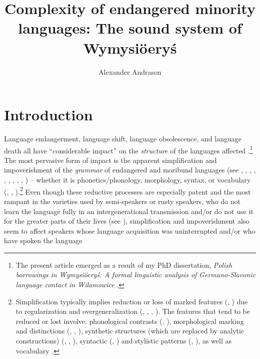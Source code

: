 \documentclass[output=paper,hidelinks]{langscibook}
\author{Alexander Andrason\affiliation{Stellenbosch University}}
\title{Complexity of endangered minority languages: The sound system of Wymysiöeryś}
\begin{document}
\maketitle


\section{Introduction} %
\label{AAsect1}
Language endangerment, language shift, language obsolescence, and language death all have “considerable impact” on the \textit{structure} of the languages affected \citep[110]{palosaari_structural_2011}.\footnote{The present article emerged as a result of my PhD dissertation, \textit{Polish borrowings in Wymysiöeryś: A formal linguistic analysis of Germano-Slavonic language contact in Wilamowice} \citep{Andrason2021}.} The most pervasive form of impact is the apparent simplification and impoverishment of the \textit{grammar} of endangered and moribund languages (see \citealt[590--591]{dorian_grammatical_1973}, \citeyear[85]{dorian_language_1980}, \citealt[9]{silva-corvalan_study_1995}, \citealt[256]{mesthrie_introducing_2009}, \citealt[110--117]{palosaari_structural_2011}, \citealt[101, 111, 118]{sallabank_diversity_2012}, \citeyear[126]{sallabank_attitudes_2013}, \citealt[2]{filipovic_introduction_2016}, \citealt[43]{aikhenvald_grammars_2007}, \citealt[294, 297]{meakins_birth_2019}) – whether it is phonetics/phonology, morphology, syntax, or vocabulary (\citealt[591]{dorian_fate_1978}, \citeyear[85]{dorian_language_1980}, \citealt[110, 113--115]{palosaari_structural_2011}).\footnote{Simplification typically implies reduction or loss of marked features (\citealt[113]{palosaari_structural_2011}, \citealt[126]{sallabank_attitudes_2013}) due to regularization and overgeneralization (\citealt[9--10]{silva-corvalan_study_1995}, \citealt[113]{palosaari_structural_2011}, \citealt[126]{sallabank_attitudes_2013}, \citealt[2]{filipovic_introduction_2016}). The features that tend to be reduced or lost involve: phonological contrasts (\citealt[85]{dorian_language_1980}, \citealt[113]{palosaari_structural_2011}), morphological marking and distinctions (\citealt[85]{dorian_language_1980}, \citealt[115]{palosaari_structural_2011}, \citealt[297]{meakins_birth_2019}), synthetic structures (which are replaced by analytic constructions) (\citealt[10]{silva-corvalan_study_1995}, \citealt[115]{palosaari_structural_2011}, \citealt[297]{meakins_birth_2019}), syntactic (\citealt[85]{dorian_language_1980}, \citealt[115]{palosaari_structural_2011}) and stylistic patterns (\citealt[85]{dorian_language_1980}, \citealt[115]{palosaari_structural_2011}), as well as vocabulary \citep[118]{sallabank_diversity_2012}.} Even though these reductive processes are especially patent and the most rampant in the varieties used by semi-speakers or rusty speakers, who do not learn the language fully in an intergenerational transmission and/or do not use it for the greater parts of their lives (see \citealt{palosaari_structural_2011, grinevald_speakers_2011}), simplification and impoverishment also seem to affect speakers whose language acquisition was uninterrupted and/or who have spoken the language 
\end{document}
